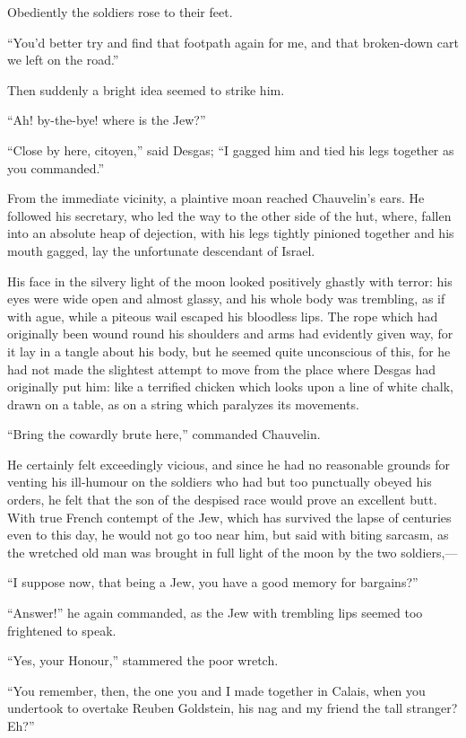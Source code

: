 \documentclass[paper=a5,BCOR=7mm,twoside,DIV=calc,12pt,usegeometry,chapterprefix,endperiod,headings=big]{scrbook}
\begin{document}
Obediently the soldiers rose to their feet.

\enquote{You'd better try and find that footpath again for me, and that broken-down cart we left on the road.}

Then suddenly a bright idea seemed to strike him.

\enquote{Ah! by-the-bye! where is the Jew?}

\enquote{Close by here, citoyen,} said Desgas; \enquote{I gagged him and tied his legs together as you commanded.}

From the immediate vicinity, a plaintive moan reached Chauvelin's ears. He followed his secretary, who led the way to the other side of the hut, where, fallen into an absolute heap of dejection, with his legs tightly pinioned together and his mouth gagged, lay the unfortunate descendant of Israel.

His face in the silvery light of the moon looked positively ghastly with terror: his eyes were wide open and almost glassy, and his whole body was trembling, as if with ague, while a piteous wail escaped his bloodless lips. The rope which had originally been wound round his shoulders and arms had evidently given way, for it lay in a tangle about his body, but he seemed quite unconscious of this, for he had not made the slightest attempt to move from the place where Desgas had originally put him: like a terrified chicken which looks upon a line of white chalk, drawn on a table, as on a string which paralyzes its movements.

\enquote{Bring the cowardly brute here,} commanded Chauvelin.

He certainly felt exceedingly vicious, and since he had no reasonable grounds for venting his ill-humour on the soldiers who had but too punctually obeyed his orders, he felt that the son of the despised race would prove an excellent butt. With true French contempt of the Jew, which has survived the lapse of centuries even to this day, he would not go too near him, but said with biting sarcasm, as the wretched old man was brought in full light of the moon by the two soldiers,---

\enquote{I suppose now, that being a Jew, you have a good memory for bargains?}

\enquote{Answer!} he again commanded, as the Jew with trembling lips seemed too frightened to speak.

\enquote{Yes, your Honour,} stammered the poor wretch.

\enquote{You remember, then, the one you and I made together in Calais, when you undertook to overtake Reuben Goldstein, his nag and my friend the tall stranger? Eh?}
\end{document}
